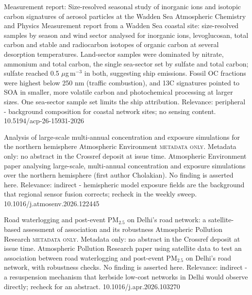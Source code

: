 \documentclass[10pt]{article}
\begin{document}
{Measurement report: Size-resolved seasonal study of inorganic ions and isotopic carbon signatures of aerosol particles at the Wadden Sea}
{Atmospheric Chemistry and Physics}
{Measurement report from a Wadden Sea coastal site: size-resolved samples by season and wind sector analysed for inorganic ions, levoglucosan, total carbon and stable and radiocarbon isotopes of organic carbon at several desorption temperatures. Land-sector samples were dominated by nitrate, ammonium and total carbon, the single sea-sector set by sulfate and total carbon; sulfate reached 0.5 $\mu$g\,m$^{-3}$ in both, suggesting ship emissions. Fossil OC fractions were highest below 250 nm (traffic combustion), and 13C signatures pointed to SOA in smaller, more volatile carbon and photochemical processing at larger sizes. One sea-sector sample set limits the ship attribution. Relevance: peripheral - background composition for coastal network sites; no sensing content.}
{10.5194/acp-26-15931-2026}

{Analysis of large-scale multi-annual concentration and exposure simulations for the northern hemisphere}
{Atmospheric Environment}
{\textsc{metadata only.} Metadata only: no abstract in the Crossref deposit at issue time. Atmospheric Environment paper analysing large-scale, multi-annual concentration and exposure simulations over the northern hemisphere (first author Cholakian). No finding is asserted here. Relevance: indirect - hemispheric model exposure fields are the background that regional sensor fusion corrects; recheck in the weekly sweep.}
{10.1016/j.atmosenv.2026.122445}

{Road waterlogging and post-event PM$_{2.5}$ on Delhi's road network: a satellite-based assessment of association and its robustness}
{Atmospheric Pollution Research}
{\textsc{metadata only.} Metadata only: no abstract in the Crossref deposit at issue time. Atmospheric Pollution Research paper using satellite data to test an association between road waterlogging and post-event PM$_{2.5}$ on Delhi's road network, with robustness checks. No finding is asserted here. Relevance: indirect - a resuspension mechanism that kerbside low-cost networks in Delhi would observe directly; recheck for an abstract.}
{10.1016/j.apr.2026.103270}
\end{document}
